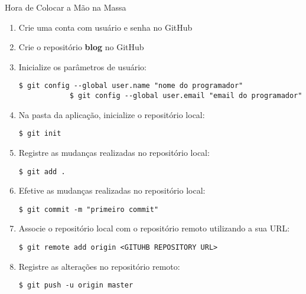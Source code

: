 \begin{frame}{Hora de Colocar a Mão na Massa}
	\begin{enumerate}
		\item Crie uma conta com usuário e senha no GitHub
		\item Crie o repositório {\bf blog} no GitHub
		
		\item Inicialize os parâmetros de usuário: 
		\begin{lstlisting}[style=BashInputBasicStyle]
			$ git config --global user.name "nome do programador"
			$ git config --global user.email "email do programador"
		\end{lstlisting}
		
		\item Na pasta da aplicação, inicialize o repositório local:
		\begin{lstlisting}[style=BashInputBasicStyle]
			$ git init
		\end{lstlisting}
		
		\item Registre as mudanças realizadas no repositório local:
		\begin{lstlisting}[style=BashInputBasicStyle]
			$ git add .
		\end{lstlisting}

        \item Efetive as mudanças realizadas no repositório local:  		
        \begin{lstlisting}[style=BashInputBasicStyle]
			$ git commit -m "primeiro commit"
		\end{lstlisting}

		\item Associe o repositório local com o repositório remoto utilizando a sua URL:
		\begin{lstlisting}[style=BashInputBasicStyle]
			$ git remote add origin <GITUHB REPOSITORY URL>
		\end{lstlisting}

		\item Registre as alterações no repositório remoto:
		\begin{lstlisting}[style=BashInputBasicStyle]
			$ git push -u origin master
		\end{lstlisting}
	\end{enumerate}
\end{frame}